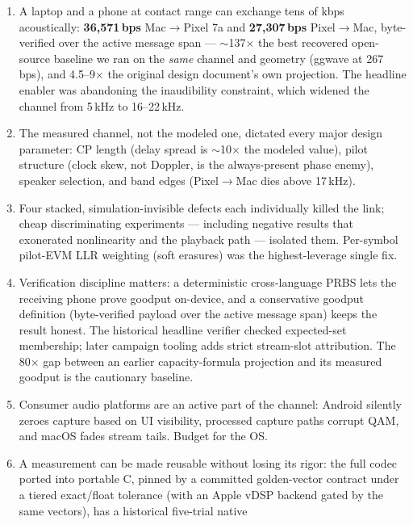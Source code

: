 \documentclass[11pt]{article}
\begin{document}
\begin{enumerate}
  \item A laptop and a phone at contact range can exchange tens of kbps
        acoustically: \textbf{36{,}571\,bps} Mac$\rightarrow$Pixel 7a and
        \textbf{27{,}307\,bps} Pixel$\rightarrow$Mac, byte-verified over the
        active message span --- $\sim$137$\times$ the best recovered open-source
        baseline we ran on the \emph{same} channel and geometry (ggwave at
        267\,bps), and 4.5--9$\times$ the original design document's own
        projection. The headline enabler was abandoning the inaudibility
        constraint, which widened the channel from 5\,kHz to 16--22\,kHz.
  \item The measured channel, not the modeled one, dictated every major
        design parameter: CP length (delay spread is $\sim$10$\times$ the
        modeled value), pilot structure (clock skew, not Doppler, is the
        always-present phase enemy), speaker selection, and band edges
        (Pixel$\rightarrow$Mac dies above 17\,kHz).
  \item Four stacked, simulation-invisible defects each individually killed
        the link; cheap discriminating experiments --- including negative
        results that exonerated nonlinearity and the playback path ---
        isolated them. Per-symbol pilot-EVM LLR weighting (soft erasures) was
        the highest-leverage single fix.
  \item Verification discipline matters: a deterministic cross-language PRBS
        lets the receiving phone prove goodput on-device, and a conservative
        goodput definition (byte-verified payload over the active message span)
        keeps the result honest. The historical headline verifier checked
        expected-set membership; later campaign tooling adds strict stream-slot
        attribution. The 80$\times$ gap between an
        earlier capacity-formula projection and its measured goodput is the
        cautionary baseline.
  \item Consumer audio platforms are an active part of the channel: Android
        silently zeroes capture based on UI visibility, processed capture
        paths corrupt QAM, and macOS fades stream tails. Budget for the OS.
  \item A measurement can be made reusable without losing its rigor: the full
        codec ported into portable C, pinned by a committed golden-vector
        contract under a tiered exact/float tolerance (with an Apple vDSP
        backend gated by the same vectors), has a historical five-trial native

\end{enumerate}
\end{document}
